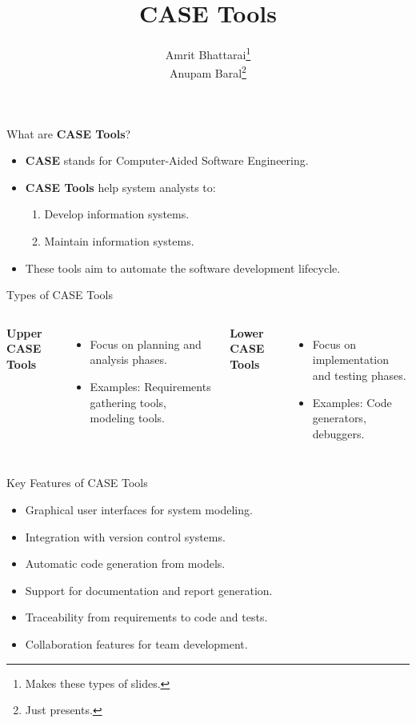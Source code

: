 \documentclass[14pt, aspectratio=1610]{beamer}
\title{CASE Tools}
\author{Amrit Bhattarai\thanks{Makes these types of slides.}\\Anupam Baral\thanks{Just presents.}}
\begin{document}
\maketitle

\begin{frame}{What are \textbf{CASE Tools}?}
	\begin{itemize}
		\item<1-> \textbf{CASE} stands for \textcolor{emphasis}{Computer-Aided Software Engineering}.
		\item<1-> \textbf{CASE Tools} help system analysts to:
			\begin{enumerate}
				\item<2-> Develop information systems.
				\item<2-> Maintain information systems.
			\end{enumerate}
		\item<3-> These tools aim to \textcolor{emphasis}{automate} the software development lifecycle.
	\end{itemize}
\end{frame}

\begin{frame}{Types of CASE Tools}
	\begin{columns}

		\textbf{Upper CASE Tools} \pause
		\begin{itemize}
			\item Focus on planning and analysis phases. \pause
			\item Examples: Requirements gathering tools, modeling tools. \pause
		\end{itemize}

		\textbf{Lower CASE Tools} \pause
		\begin{itemize}
			\item Focus on implementation and testing phases. \pause
			\item Examples: Code generators, debuggers. \pause
		\end{itemize}

	\end{columns}
\end{frame}

\begin{frame}{Key Features of CASE Tools}
	\begin{itemize}
		\item<1-> Graphical user interfaces for system modeling. \pause
		\item<2-> Integration with version control systems. \pause
		\item<3-> Automatic code generation from models. \pause
		\item<4-> Support for documentation and report generation. \pause
		\item<5-> Traceability from requirements to code and tests. \pause
		\item<6-> Collaboration features for team development.
	\end{itemize}
\end{frame}
\end{document}
